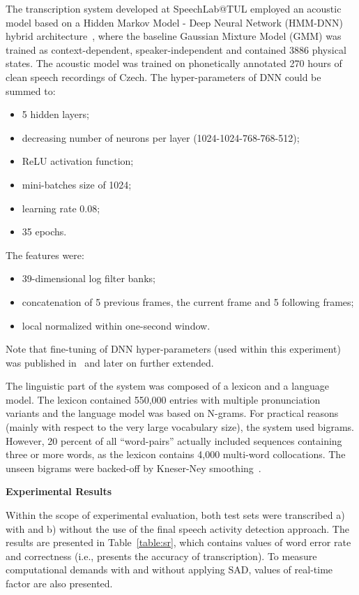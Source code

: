 \documentclass[FM,noheader,EN,bwtitles]{tulthesis}
\begin{document}
The transcription system developed at SpeechLab@TUL employed an acoustic model based on a Hidden Markov Model - Deep Neural Network (HMM-DNN) hybrid architecture~\parencite{DBLP:journals/taslp/DahlYDA12}, where the baseline Gaussian Mixture Model (GMM) was trained as context-dependent, speaker-independent and contained 3886 physical states.
The acoustic model was trained on phonetically annotated 270 hours of clean speech recordings of Czech.
The hyper-parameters of DNN could be summed to:
\begin{itemize}
\item 5 hidden layers;
\item decreasing number of neurons per layer (1024-1024-768-768-512);
\item ReLU activation function;
\item mini-batches size of 1024;
\item learning rate 0.08;
\item 35 epochs.
\end{itemize}
The features were:
\begin{itemize}
\item 39-dimensional log filter banks;
\item concatenation of 5 previous frames, the current frame and 5 following frames;
\item local normalized within one-second window.
\end{itemize}
Note that fine-tuning of DNN hyper-parameters (used within this experiment) was published in~\parencite{ECMSM15} and later on further extended.

The linguistic part of the system was composed of a lexicon and a language model.
The lexicon contained 550,000 entries with multiple pronunciation variants and the language model was based on \mbox{N-grams}.
For practical reasons (mainly with respect to the very large vocabulary size), the system used bigrams.
However, 20 percent of all “word-pairs” actually included sequences containing three or more words, as the lexicon contains 4,000 multi-word collocations.
The unseen bigrams were backed-off by Kneser-Ney smoothing~\parencite{DBLP:conf/icassp/KneserN95}.

\bigskip
\noindent
\textbf{Experimental Results}
\medskip

\noindent
Within the scope of experimental evaluation, both test sets were transcribed a) with and b) without the use of the final speech activity detection approach.
The results are presented in Table~\ref{table:sr}, which contains values of word error rate and correctness (i.e., presents the accuracy of transcription). 
To measure computational demands with and without applying SAD, values of real-time factor are also presented.
\end{document}
